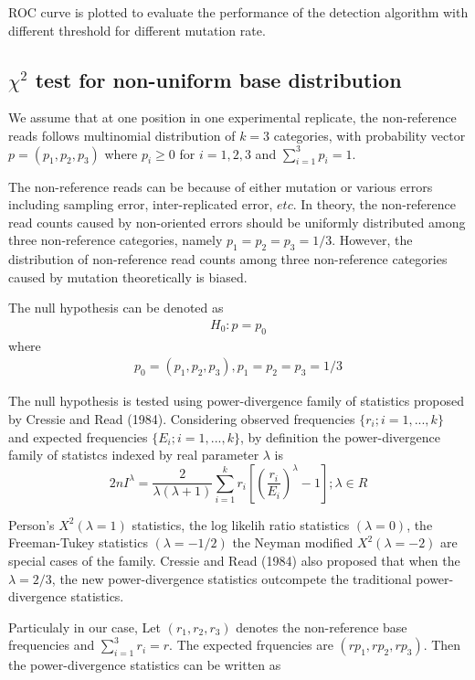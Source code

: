 \documentclass[11pt,reqno]{amsart}
\begin{document}
ROC curve is plotted to evaluate the performance of the detection algorithm with different threshold for different mutation rate. 


\subsection{$\chi^2$ test for non-uniform base distribution}

We assume that at one position in one experimental replicate, the non-reference reads follows multinomial distribution of $k = 3$ categories, with probability vector $p = (p_1, p_2, p_3)$ where $p_i \geq 0$ for $i =1, 2, 3$ and $\sum_{i=1}^3 p_i = 1$.

The non-reference reads can be because of either mutation or various errors including sampling error, inter-replicated error, $etc$. In theory, the non-reference read counts caused by non-oriented errors should be uniformly distributed among three non-reference categories, namely $p_1=p_2=p_3=1/3$. However, the distribution of non-reference read counts among three non-reference categories caused by mutation theoretically is biased. 

The null hypothesis can be denoted as
\begin{align}
 H_0: p=p_0
\end{align}
where
\begin{align} 
 p_0=(p_1,p_2,p_3), p_1=p_2=p_3=1/3
\end{align}

The null hypothesis is tested using power-divergence family of statistics proposed by Cressie and Read (1984). Considering observed frequencies $\{r_i; i=1,...,k\}$ and expected frequencies $\{E_i; i=1,...,k\}$, by definition the power-divergence family of statistcs indexed by real parameter $\lambda$ is 
\begin{equation}
 2nI^\lambda = \frac{2}{\lambda(\lambda+1)}\sum_{i=1}^k r_i \left[\left(\frac{r_i}{E_i}\right)^\lambda-1\right];\lambda \in R
\end{equation}

Person's $X^2 (\lambda = 1)$ statistics, the log likelih ratio statistics $(\lambda = 0)$, the Freeman-Tukey statistics $(\lambda = -1/2)$ the Neyman modified $X^2 (\lambda = -2)$ are special cases of the family. Cressie and Read (1984) also proposed that when the $\lambda =2/3$, the new power-divergence statistics outcompete the traditional power-divergence statistics. 

Particulaly in our case, Let $(r_1,r_2,r_3)$ denotes the non-reference base frequencies and $\sum_{i=1}^3 r_i = r$. The expected frquencies are $(rp_1, rp_2, rp_3)$. Then the power-divergence statistics can be written as
\end{document}
